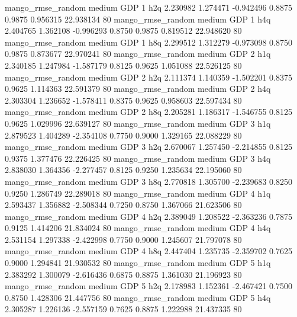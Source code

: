 mango_rmse_random     medium      GDP                 1                  h2q  2.230982 1.274471 -0.942496 0.8875 0.9875  0.956315   22.938134 80
mango_rmse_random     medium      GDP                 1                  h4q  2.404765 1.362108 -0.996293 0.8750 0.9875  0.819512   22.948620 80
mango_rmse_random     medium      GDP                 1                  h8q  2.299512 1.312279 -0.973098 0.8750 0.9875  0.873677   22.970241 80
mango_rmse_random     medium      GDP                 2                  h1q  2.340185 1.247984 -1.587179 0.8125 0.9625  1.051088   22.526125 80
mango_rmse_random     medium      GDP                 2                  h2q  2.111374 1.140359 -1.502201 0.8375 0.9625  1.114363   22.591379 80
mango_rmse_random     medium      GDP                 2                  h4q  2.303304 1.236652 -1.578411 0.8375 0.9625  0.958603   22.597434 80
mango_rmse_random     medium      GDP                 2                  h8q  2.205281 1.186317 -1.546755 0.8125 0.9625  1.029996   22.639127 80
mango_rmse_random     medium      GDP                 3                  h1q  2.879523 1.404289 -2.354108 0.7750 0.9000  1.329165   22.088229 80
mango_rmse_random     medium      GDP                 3                  h2q  2.670067 1.257450 -2.214855 0.8125 0.9375  1.377476   22.226425 80
mango_rmse_random     medium      GDP                 3                  h4q  2.838030 1.364356 -2.277457 0.8125 0.9250  1.235634   22.195060 80
mango_rmse_random     medium      GDP                 3                  h8q  2.770818 1.305700 -2.239683 0.8250 0.9250  1.286749   22.289018 80
mango_rmse_random     medium      GDP                 4                  h1q  2.593437 1.356882 -2.508344 0.7250 0.8750  1.367066   21.623506 80
mango_rmse_random     medium      GDP                 4                  h2q  2.389049 1.208522 -2.363236 0.7875 0.9125  1.414206   21.834024 80
mango_rmse_random     medium      GDP                 4                  h4q  2.531154 1.297338 -2.422998 0.7750 0.9000  1.245607   21.797078 80
mango_rmse_random     medium      GDP                 4                  h8q  2.447404 1.235735 -2.359702 0.7625 0.9000  1.294841   21.930532 80
mango_rmse_random     medium      GDP                 5                  h1q  2.383292 1.300079 -2.616436 0.6875 0.8875  1.361030   21.196923 80
mango_rmse_random     medium      GDP                 5                  h2q  2.178983 1.152361 -2.467421 0.7500 0.8750  1.428306   21.447756 80
mango_rmse_random     medium      GDP                 5                  h4q  2.305287 1.226136 -2.557159 0.7625 0.8875  1.222988   21.437335 80
